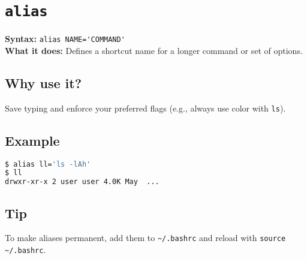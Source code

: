 \documentclass[10pt,oneside]{scrbook}
\begin{document}
\section{\texttt{alias}}
\begin{cmdbox}
  \textbf{Syntax:} \lstinline!alias NAME='COMMAND'! \\
  \textbf{What it does:} Defines a shortcut name for a longer command or set of options.
\end{cmdbox}
\begin{commanddetails}
  \subsection*{Why use it?}
    Save typing and enforce your preferred flags (e.g., always use color with \texttt{ls}).

  \subsection*{Example}
  \begin{lstlisting}[language=bash]
$ alias ll='ls -lAh'
$ ll
drwxr-xr-x 2 user user 4.0K May  ...
  \end{lstlisting}

  \subsection*{Tip}
    To make aliases permanent, add them to \lstinline!~/.bashrc! and reload with \lstinline!source ~/.bashrc!.
\end{commanddetails}

\end{document}

